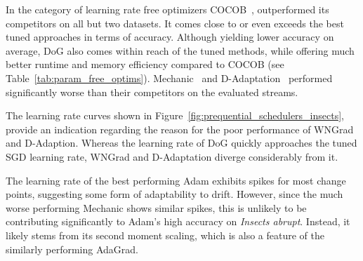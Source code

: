 \documentclass{article} %
\begin{document}
In the category of learning rate free optimizers COCOB~\citep{orabonaTrainingDeepNetworks2017}, outperformed its competitors on all but two datasets.
It comes close to or even exceeds the best tuned approaches in terms of accuracy.
Although yielding lower accuracy on average, DoG also comes within reach of the tuned methods, while offering much better runtime and memory efficiency compared to COCOB (see Table~\ref{tab:param_free_optims}).
Mechanic~\citep{cutkoskyMechanicLearningRate2023} and D-Adaptation~\citep{defazioLearningRateFreeLearningDAdaptation2023a} performed significantly worse than their competitors on the evaluated streams.

The learning rate curves shown in Figure~\ref{fig:prequential_schedulers_insects}, provide an indication regarding the reason for the poor performance of WNGrad and D-Adaption.
Whereas the learning rate of DoG quickly approaches the tuned SGD learning rate, WNGrad and D-Adaptation diverge considerably from it.

The learning rate of the best performing Adam exhibits spikes for most change points, suggesting some form of adaptability to drift.
However, since the much worse performing Mechanic shows similar spikes, this is unlikely to be contributing significantly to Adam's high accuracy on \textit{Insects abrupt}.
Instead, it likely stems from its second moment scaling, which is also a feature of the similarly performing AdaGrad.
\end{document}
